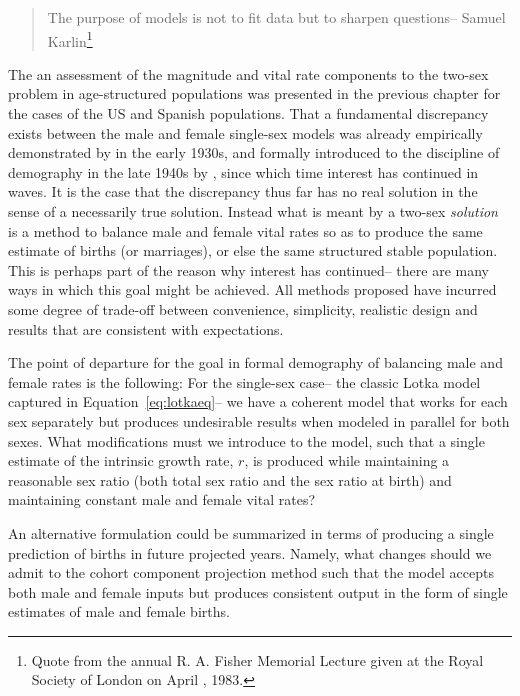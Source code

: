  \FloatBarrier
\label{sec:modelingapproaches}
\begin{singlespace}
\begin{quote}
The purpose of models is not to fit data but to sharpen questions-- Samuel
Karlin\footnote{Quote from the  annual R. A. Fisher Memorial Lecture
given at the Royal Society of London on April , 1983.}
\end{quote}
\end{singlespace}

The an assessment of the magnitude and vital rate components to the two-sex
problem in age-structured populations was presented in the previous
chapter for the cases of the US and Spanish populations. That a fundamental
discrepancy exists between the male and female single-sex models was already
empirically demonstrated by \citet{kuczynski1932fertility} in the early 1930s, and formally introduced to
the discipline of demography in the late 1940s by
\citet{karmel1947relations, karmel1948measurement}, since which time interest
has continued in waves. It is the case that the discrepancy thus far has no real 
solution in the sense of a necessarily true
solution. Instead what is meant by a two-sex \textit{solution} is a method to
balance male and female vital rates so as to produce the same estimate of births (or marriages), 
or else the same structured stable population. This is
perhaps part of the reason why interest has continued-- there are many ways in which this goal
might be achieved. All methods proposed have incurred some degree of trade-off
between convenience, simplicity, realistic design and results that are
consistent with expectations.
 
The point of departure for the goal in formal demography of balancing male and
female rates is the following: For the single-sex case-- the classic Lotka
model captured in Equation~\eqref{eq:lotkaeq}-- we have a coherent model that
works for each sex separately but produces undesirable results when modeled in parallel for both
sexes. What modifications must we introduce to the model, such that a single
estimate of the intrinsic growth rate, $r$, is produced while maintaining a
reasonable sex ratio (both total sex ratio and the sex ratio at birth) and
maintaining constant male and female vital rates? 

An alternative formulation
could be summarized in terms of producing a single prediction of births in
future projected years. Namely, what changes should we admit to the cohort
component projection method such that the model accepts both male and
female inputs but produces consistent output in the form of single estimates of
male and female births.

